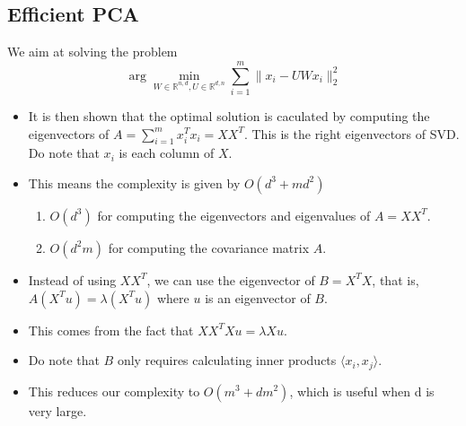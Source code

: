 \documentclass[11pt,reqno]{amsart}
\theoremstyle{remark}
\begin{document}
\subsection*{Efficient PCA}
We aim at solving the problem 
\[
\arg\min_{W\in\mathbb{R}^{n,d}, U\in\mathbb{R}^{d,n}}\sum^m_{i=1}\lVert x_i-UWx_i\rVert^2_2
\]
\begin{itemize}
\item It is then shown that the optimal solution is caculated by computing the eigenvectors of $A=\sum^m_{i=1}x_i^Tx_i=XX^T$. 
This is the right eigenvectors of SVD. Do note that $x_i$ is each column of $X$.
\item This means the complexity is given by $O(d^3+md^2)$
\begin{enumerate}
\item $O(d^3)$ for computing the eigenvectors and eigenvalues of $A=XX^T$.
\item $O(d^2 m)$ for computing the covariance matrix $A$.
\end{enumerate}
\item Instead of using $XX^T$, we can use the eigenvector of $B=X^TX$, that is, 
$A(X^Tu)=\lambda(X^T u)$ where $u$ is an eigenvector of $B$.
\item This comes from the fact that $X X^TX u=\lambda X u$.
\item Do note that $B$ only requires calculating inner products $\langle x_i,x_j\rangle$.
\item This reduces our complexity to $O(m^3+dm^2)$, which is useful when d is very large.
\end{itemize}
\end{document}
